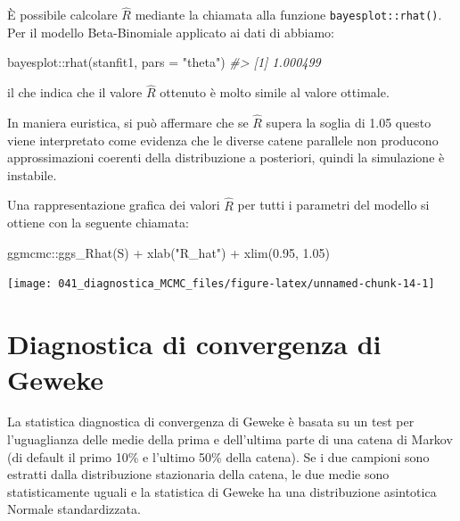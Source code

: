 \documentclass[
  11pt,
  italian,
  a4paper,
  extrafontsizes,onecolumn,openright
  ]{memoir}
\newenvironment{Shaded}{\begin{snugshade}}{\end{snugshade}}
\newcommand{\AttributeTok}[1]{\textcolor[rgb]{0.77,0.63,0.00}{#1}}
\newcommand{\CommentTok}[1]{\textcolor[rgb]{0.56,0.35,0.01}{\textit{#1}}}
\newcommand{\FloatTok}[1]{\textcolor[rgb]{0.00,0.00,0.81}{#1}}
\newcommand{\FunctionTok}[1]{\textcolor[rgb]{0.00,0.00,0.00}{#1}}
\newcommand{\NormalTok}[1]{#1}
\newcommand{\SpecialCharTok}[1]{\textcolor[rgb]{0.00,0.00,0.00}{#1}}
\newcommand{\StringTok}[1]{\textcolor[rgb]{0.31,0.60,0.02}{#1}}
\begin{document}
È possibile calcolare \(\hat{R}\) mediante la chiamata alla funzione \texttt{bayesplot::rhat()}. Per il modello Beta-Binomiale applicato ai dati di \textcite{Gautret_2020} abbiamo:

\begin{Shaded}
\begin{Highlighting}[]
\NormalTok{bayesplot}\SpecialCharTok{::}\FunctionTok{rhat}\NormalTok{(stanfit1, }\AttributeTok{pars =} \StringTok{"theta"}\NormalTok{)}
\CommentTok{\#\textgreater{} [1] 1.000499}
\end{Highlighting}
\end{Shaded}

\noindent
il che indica che il valore \(\hat{R}\) ottenuto è molto simile al valore ottimale.

In maniera euristica, si può affermare che se \(\hat{R}\) supera la soglia di 1.05 questo viene interpretato come evidenza che le diverse catene parallele non producono approssimazioni coerenti della distribuzione a posteriori, quindi la simulazione è instabile.

Una rappresentazione grafica dei valori \(\hat{R}\) per tutti i parametri del modello si ottiene con la seguente chiamata:

\begin{Shaded}
\begin{Highlighting}[]
\NormalTok{ggmcmc}\SpecialCharTok{::}\FunctionTok{ggs\_Rhat}\NormalTok{(S) }\SpecialCharTok{+} \FunctionTok{xlab}\NormalTok{(}\StringTok{"R\_hat"}\NormalTok{) }\SpecialCharTok{+} \FunctionTok{xlim}\NormalTok{(}\FloatTok{0.95}\NormalTok{, }\FloatTok{1.05}\NormalTok{)}
\end{Highlighting}
\end{Shaded}

\begin{center}\texttt{[image: 041\_diagnostica\_MCMC\_files/figure-latex/unnamed-chunk-14-1]} \end{center}

\hypertarget{diagnostica-di-convergenza-di-geweke}{%
\section{Diagnostica di convergenza di Geweke}\label{diagnostica-di-convergenza-di-geweke}}

La statistica diagnostica di convergenza di Geweke è basata su un test per l'uguaglianza delle medie della prima e dell'ultima parte di una catena di Markov (di default il primo 10\% e l'ultimo 50\% della catena). Se i due campioni sono estratti dalla distribuzione stazionaria della catena, le due medie sono statisticamente uguali e la statistica di Geweke ha una distribuzione asintotica Normale standardizzata.
\end{document}
